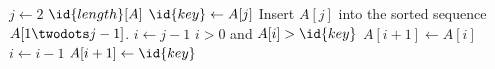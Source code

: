 \documentclass{article}
\begin{document}
\begin{codebox}
\li \For $j \gets 2$ \To $\id{length}[A]$
\li	\Do 
		$\id{key} \gets A[j]$
\li		\Comment Insert $A[j]$ into the sorted sequence
			$A[1 \twodots j-1]$.
\li		$i \gets j-1$
\li		\While $i > 0$ and $A[i] > \id{key}$
\li			\Do 
				$A[i+1] \gets A[i]$
\li				$i \gets i-1$
			\End 
\li		$A[i+1] \gets \id{key}$
	\End 
\end{codebox}
\end{document}
